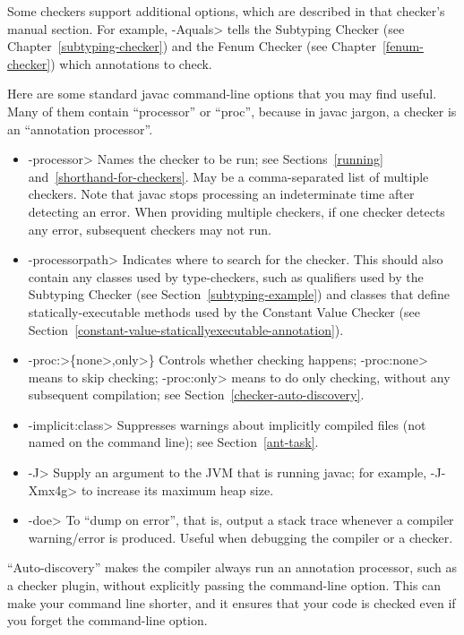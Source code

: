 \noindent
Some checkers support additional options, which are described in that
checker's manual section.
For example, \<-Aquals> tells
the Subtyping Checker (see Chapter~\ref{subtyping-checker}) and the Fenum Checker
(see Chapter~\ref{fenum-checker}) which annotations to check.


Here are some standard javac command-line options that you may find useful.
Many of them contain ``processor'' or ``proc'', because in javac jargon, a
checker is an ``annotation processor''.

\begin{itemize}
\item \<-processor> Names the checker to be
  run; see Sections~\ref{running} and~\ref{shorthand-for-checkers}.
  May be a comma-separated list of multiple checkers.  Note that javac
  stops processing an indeterminate time after detecting an error.  When
  providing multiple checkers, if one checker detects any error, subsequent
  checkers may not run.
\item \<-processorpath> Indicates where to search for the
  checker.  This should also contain any classes used by type-checkers,
  such as qualifiers used by the Subtyping Checker (see
  Section~\ref{subtyping-example}) and classes that define
  statically-executable methods used by the Constant Value Checker (see
  Section~\ref{constant-value-staticallyexecutable-annotation}).
\item \<-proc:>\{\<none>,\<only>\} Controls whether checking
  happens; \<-proc:none>
  means to skip checking; \<-proc:only> means to do only
  checking, without any subsequent compilation; see
  Section~\ref{checker-auto-discovery}.
\item \<-implicit:class> Suppresses warnings about implicitly compiled files
  (not named on the command line); see Section~\ref{ant-task}.
\item \<-J> Supply an argument to the JVM that is running javac;
  for example, \<-J-Xmx4g> to increase its maximum heap size.
\item \<-doe> To ``dump on error'', that is, output a stack trace
  whenever a compiler warning/error is produced. Useful when debugging
  the compiler or a checker.
\end{itemize}



``Auto-discovery'' makes the  compiler always run an
annotation processor, such as a checker
plugin, without explicitly passing the 
command-line option.  This can make your command line shorter, and it ensures
that your code is checked even if you forget the command-line option.

